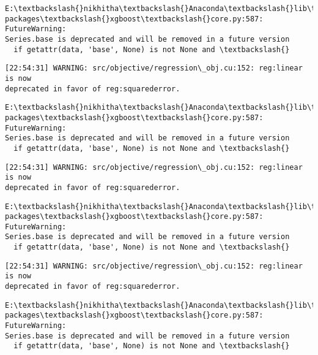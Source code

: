 \documentclass[11pt]{article}
\begin{document}
    \begin{Verbatim}[commandchars=\\\{\}]
E:\textbackslash{}nikhitha\textbackslash{}Anaconda\textbackslash{}lib\textbackslash{}site-packages\textbackslash{}xgboost\textbackslash{}core.py:587: FutureWarning:
Series.base is deprecated and will be removed in a future version
  if getattr(data, 'base', None) is not None and \textbackslash{}
    \end{Verbatim}

    \begin{Verbatim}[commandchars=\\\{\}]
[22:54:31] WARNING: src/objective/regression\_obj.cu:152: reg:linear is now
deprecated in favor of reg:squarederror.
    \end{Verbatim}

    \begin{Verbatim}[commandchars=\\\{\}]
E:\textbackslash{}nikhitha\textbackslash{}Anaconda\textbackslash{}lib\textbackslash{}site-packages\textbackslash{}xgboost\textbackslash{}core.py:587: FutureWarning:
Series.base is deprecated and will be removed in a future version
  if getattr(data, 'base', None) is not None and \textbackslash{}
    \end{Verbatim}

    \begin{Verbatim}[commandchars=\\\{\}]
[22:54:31] WARNING: src/objective/regression\_obj.cu:152: reg:linear is now
deprecated in favor of reg:squarederror.
    \end{Verbatim}

    \begin{Verbatim}[commandchars=\\\{\}]
E:\textbackslash{}nikhitha\textbackslash{}Anaconda\textbackslash{}lib\textbackslash{}site-packages\textbackslash{}xgboost\textbackslash{}core.py:587: FutureWarning:
Series.base is deprecated and will be removed in a future version
  if getattr(data, 'base', None) is not None and \textbackslash{}
    \end{Verbatim}

    \begin{Verbatim}[commandchars=\\\{\}]
[22:54:31] WARNING: src/objective/regression\_obj.cu:152: reg:linear is now
deprecated in favor of reg:squarederror.
    \end{Verbatim}

    \begin{Verbatim}[commandchars=\\\{\}]
E:\textbackslash{}nikhitha\textbackslash{}Anaconda\textbackslash{}lib\textbackslash{}site-packages\textbackslash{}xgboost\textbackslash{}core.py:587: FutureWarning:
Series.base is deprecated and will be removed in a future version
  if getattr(data, 'base', None) is not None and \textbackslash{}
    \end{Verbatim}
\end{document}
